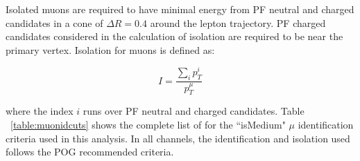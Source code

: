Isolated muons are required to have minimal energy from PF neutral and charged candidates in a cone of $\Delta R =
0.4$ around the lepton trajectory. PF charged candidates considered in the calculation of isolation are required to be near the 
primary vertex. Isolation for muons is defined as:

\begin{equation}
   I = \frac{\sum_{i} p_{T}^{i}}{p_{T}^{\mu}}
\label{eq:muIso}
\end{equation}

where the index $i$ runs over PF neutral and charged candidates. Table
~\ref{table:muonidcuts} shows the complete list of for the ``isMedium" $\mu$ identification criteria used in this analysis.
In all channels, the identification and isolation used follows the POG recommended criteria. 

\begin{table}[ht]
  \caption{$\mu$ Identification}
  \label{table:muonidcuts} %
\end{table}
